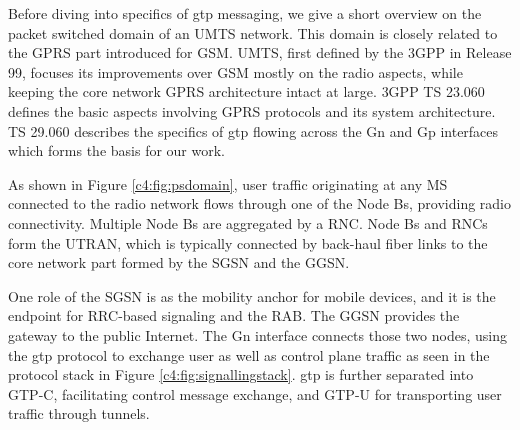 Before diving into specifics of \gls{gtp} messaging, we give a short overview on the packet switched domain of an \gls{UMTS} network. This domain is closely related to the \gls{GPRS} part introduced for \acrshort{GSM}. \gls{UMTS}, first defined by the \gls{3GPP} in Release 99, focuses its improvements over \gls{GSM} mostly on the radio aspects, while keeping the core network \gls{GPRS} architecture intact at large. \gls{3GPP} \gls{TS} 23.060 \cite{3gpp.23.060} defines the basic aspects involving \gls{GPRS} protocols and its system architecture. \gls{TS} 29.060 \cite{3gpp.29.060} describes the specifics of \gls{gtp} flowing across the Gn and Gp interfaces which forms the basis for our work.

As shown in Figure \ref{c4:fig:psdomain}, user traffic originating at any \gls{MS} connected to the radio network flows through one of the Node Bs, providing radio connectivity. Multiple Node Bs are aggregated by a \gls{RNC}. Node Bs and \glspl{RNC} form the \gls{UTRAN}, which is typically connected by back-haul fiber links to the core network part formed by the \gls{SGSN} and the \gls{GGSN}.

One role of the \gls{SGSN} is as the mobility anchor for mobile devices, and it is the endpoint for \gls{RRC}-based signaling and the \gls{RAB}. The \gls{GGSN} provides the gateway to the public Internet. The Gn interface connects those two nodes, using the \gls{gtp} protocol to exchange user as well as control plane traffic as seen in the protocol stack in Figure \ref{c4:fig:signallingstack}. \gls{gtp} is further separated into GTP-C, facilitating control message exchange, and GTP-U for transporting user traffic through tunnels.








